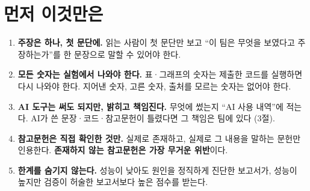 \documentclass[11pt]{article}
\begin{document}


\section*{먼저 이것만은}
\begin{enumerate}
\item \textbf{주장은 하나, 첫 문단에.} 읽는 사람이 첫 문단만 보고 ``이 팀은 무엇을 보였다고 주장하는가''를 한 문장으로 말할 수 있어야 한다.
\item \textbf{모든 숫자는 실험에서 나와야 한다.} 표·그래프의 숫자는 제출한 코드를 실행하면 다시 나와야 한다. 지어낸 숫자, 고른 숫자, 출처를 모르는 숫자는 없어야 한다.
\item \textbf{AI 도구는 써도 되지만, 밝히고 책임진다.} 무엇에 썼는지 ``AI 사용 내역''에 적는다. AI가 쓴 문장·코드·참고문헌이 틀렸다면 그 책임은 팀에 있다 (3절).
\item \textbf{참고문헌은 직접 확인한 것만.} 실제로 존재하고, 실제로 그 내용을 말하는 문헌만 인용한다. \textbf{존재하지 않는 참고문헌은 가장 무거운 위반}이다.
\item \textbf{한계를 숨기지 않는다.} 성능이 낮아도 원인을 정직하게 진단한 보고서가, 성능이 높지만 검증이 허술한 보고서보다 높은 점수를 받는다.
\end{enumerate}
\end{document}
